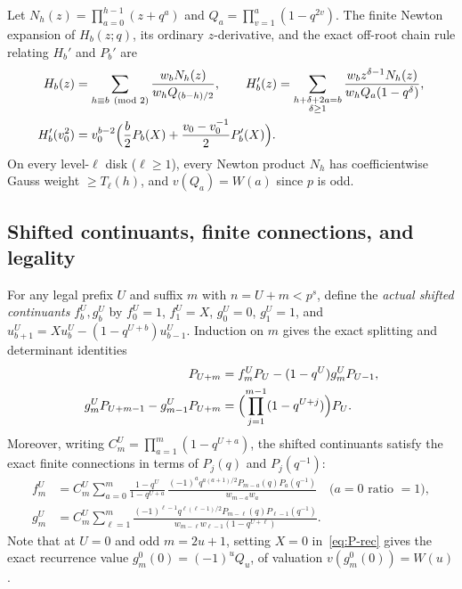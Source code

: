 \documentclass[11pt,reqno]{amsart}
\numberwithin{equation}{section}
\theoremstyle{definition}
\theoremstyle{remark}
\begin{document}
Let $N_h(z) = \prod_{a=0}^{h-1}(z+q^a)$ and $Q_a = \prod_{v=1}^a(1-q^{2v})$. The finite Newton expansion of $H_b(z;q)$, its ordinary $z$-derivative, and the exact off-root chain rule relating $H_b'$ and $P_b'$ are
\begin{align}
H_b(z) &= \sum_{h\equiv b\pmod 2} \frac{w_b N_h(z)}{w_h Q_{(b-h)/2}}, \qquad
H_b'(z) = \sum_{\substack{h+\delta+2a=b\\ \delta\ge 1}} \frac{w_b z^{\delta-1} N_h(z)}{w_h Q_a(1-q^\delta)}, \label{eq:newton}\\
H_b'(v_0^2) &= v_0^{b-2}\Bigl(\frac{b}{2}P_b(X) + \frac{v_0 - v_0^{-1}}{2} P_b'(X)\Bigr). \label{eq:chain-rule}
\end{align}
On every level-$\ell$ disk ($\ell\ge 1$), every Newton product $N_h$ has coefficientwise Gauss weight $\ge T_\ell(h)$, and $v(Q_a)=W(a)$ since $p$ is odd.

\subsection{Shifted continuants, finite connections, and legality}

For any legal prefix $U$ and suffix $m$ with $n = U + m < p^s$, define the \emph{actual shifted continuants} $f_b^U, g_b^U$ by $f_0^U=1$, $f_1^U=X$, $g_0^U=0$, $g_1^U=1$, and $u_{b+1}^U = X u_b^U - (1-q^{U+b})u_{b-1}^U$. Induction on $m$ gives the exact splitting and determinant identities
\begin{align}
P_{U+m} &= f_m^U P_U - (1-q^U) g_m^U P_{U-1}, \label{eq:cont-split}\\
g_m^U P_{U+m-1} - g_{m-1}^U P_{U+m} &= \Bigl(\prod_{j=1}^{m-1}(1-q^{U+j})\Bigr) P_U. \label{eq:cont-det}
\end{align}
Moreover, writing $C_m^U = \prod_{a=1}^m(1-q^{U+a})$, the shifted continuants satisfy the exact finite connections in terms of $P_j(q)$ and $P_j(q^{-1})$:
\begin{align}
f_m^U &= C_m^U \sum_{a=0}^m \frac{1-q^U}{1-q^{U+a}}\, \frac{(-1)^a q^{a(a+1)/2} P_{m-a}(q) P_a(q^{-1})}{w_{m-a} w_a} \quad\text{($a=0$ ratio $=1$)}, \label{eq:f-conn}\\
g_m^U &= C_m^U \sum_{\ell=1}^m \frac{(-1)^{\ell-1} q^{\ell(\ell-1)/2} P_{m-\ell}(q) P_{\ell-1}(q^{-1})}{w_{m-\ell} w_{\ell-1}(1-q^{U+\ell})}. \label{eq:g-conn}
\end{align}
Note that at $U=0$ and odd $m=2u+1$, setting $X=0$ in~\eqref{eq:P-rec} gives the exact recurrence value $g_m^0(0) = (-1)^u Q_u$, of valuation $v(g_m^0(0)) = W(u)$.
\end{document}
